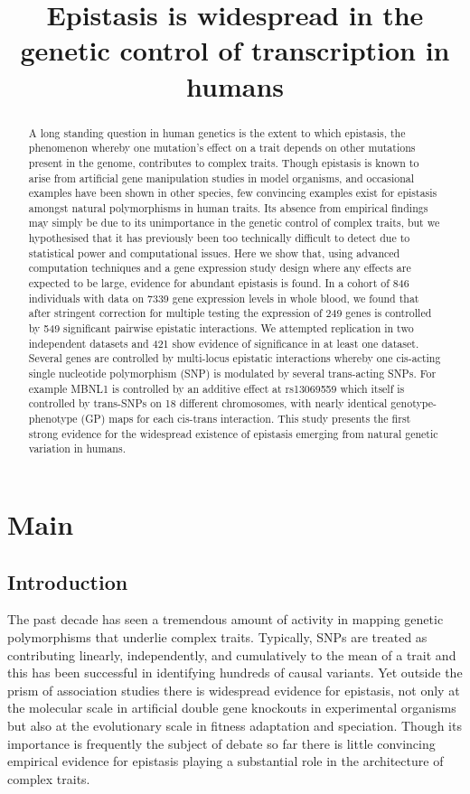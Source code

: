 \documentclass{article}
\title{Epistasis is widespread in the genetic control of transcription in humans}
\begin{document}
\maketitle


\begin{abstract}
A long standing question in human genetics is the extent to which epistasis, the phenomenon whereby one mutation's effect on a trait depends on other mutations present in the genome, contributes to complex traits. Though epistasis is known to arise from artificial gene manipulation studies in model organisms, and occasional examples have been shown in other species, few convincing examples exist for epistasis amongst natural polymorphisms in human traits. Its absence from empirical findings may simply be due to its unimportance in the genetic control of complex traits, but we hypothesised that it has previously been too technically difficult to detect due to statistical power and computational issues. Here we show that, using advanced computation techniques and a gene expression study design where any effects are expected to be large, evidence for abundant epistasis is found. In a cohort of 846 individuals with data on 7339 gene expression levels in whole blood, we found that after stringent correction for multiple testing the expression of 249 genes is controlled by 549 significant pairwise epistatic interactions. We attempted replication in two independent datasets and 421 show evidence of significance in at least one dataset. Several genes are controlled by multi-locus epistatic interactions whereby one cis-acting single nucleotide polymorphism (SNP) is modulated by several trans-acting SNPs. For example MBNL1 is controlled by an additive effect at rs13069559 which itself is controlled by trans-SNPs on 18 different chromosomes, with nearly identical genotype-phenotype (GP) maps for each cis-trans interaction. This study presents the first strong evidence for the widespread existence of epistasis emerging from natural genetic variation in humans.
\end{abstract}


\section{Main}

\subsection{Introduction}
The past decade has seen a tremendous amount of activity in mapping genetic polymorphisms that underlie complex traits. Typically, SNPs are treated as contributing linearly, independently, and cumulatively to the mean of a trait and this has been successful in identifying hundreds of causal variants. Yet outside the prism of association studies there is widespread evidence for epistasis, not only at the molecular scale in artificial double gene knockouts in experimental organisms but also at the evolutionary scale in fitness adaptation and speciation. Though its importance is frequently the subject of debate so far there is little convincing empirical evidence for epistasis playing a substantial role in the architecture of complex traits.
\end{document}
